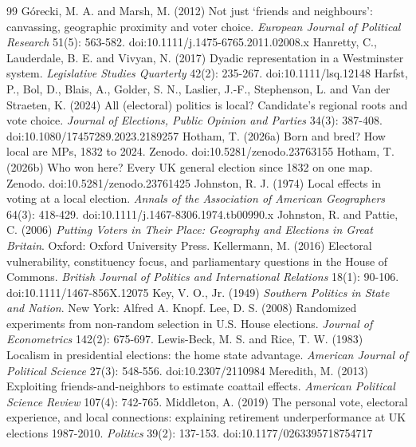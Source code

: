 \documentclass[11pt,a4paper]{article}
\begin{document}
\begin{thebibliography}{99}
 G\'orecki, M. A. and Marsh, M. (2012) Not just `friends and neighbours': canvassing, geographic proximity and voter choice. \textit{European Journal of Political Research} 51(5): 563-582. doi:10.1111/j.1475-6765.2011.02008.x
 Hanretty, C., Lauderdale, B. E. and Vivyan, N. (2017) Dyadic representation in a Westminster system. \textit{Legislative Studies Quarterly} 42(2): 235-267. doi:10.1111/lsq.12148
 Harfst, P., Bol, D., Blais, A., Golder, S. N., Laslier, J.-F., Stephenson, L. and Van der Straeten, K. (2024) All (electoral) politics is local? Candidate's regional roots and vote choice. \textit{Journal of Elections, Public Opinion and Parties} 34(3): 387-408. doi:10.1080/17457289.2023.2189257
 Hotham, T. (2026a) Born and bred? How local are MPs, 1832 to 2024. Zenodo. doi:10.5281/zenodo.23763155
 Hotham, T. (2026b) Who won here? Every UK general election since 1832 on one map. Zenodo. doi:10.5281/zenodo.23761425
 Johnston, R. J. (1974) Local effects in voting at a local election. \textit{Annals of the Association of American Geographers} 64(3): 418-429. doi:10.1111/j.1467-8306.1974.tb00990.x
 Johnston, R. and Pattie, C. (2006) \textit{Putting Voters in Their Place: Geography and Elections in Great Britain}. Oxford: Oxford University Press.
 Kellermann, M. (2016) Electoral vulnerability, constituency focus, and parliamentary questions in the House of Commons. \textit{British Journal of Politics and International Relations} 18(1): 90-106. doi:10.1111/1467-856X.12075
 Key, V. O., Jr. (1949) \textit{Southern Politics in State and Nation}. New York: Alfred A. Knopf.
 Lee, D. S. (2008) Randomized experiments from non-random selection in U.S. House elections. \textit{Journal of Econometrics} 142(2): 675-697.
 Lewis-Beck, M. S. and Rice, T. W. (1983) Localism in presidential elections: the home state advantage. \textit{American Journal of Political Science} 27(3): 548-556. doi:10.2307/2110984
 Meredith, M. (2013) Exploiting friends-and-neighbors to estimate coattail effects. \textit{American Political Science Review} 107(4): 742-765.
 Middleton, A. (2019) The personal vote, electoral experience, and local connections: explaining retirement underperformance at UK elections 1987-2010. \textit{Politics} 39(2): 137-153. doi:10.1177/0263395718754717

\end{thebibliography}
\end{document}
